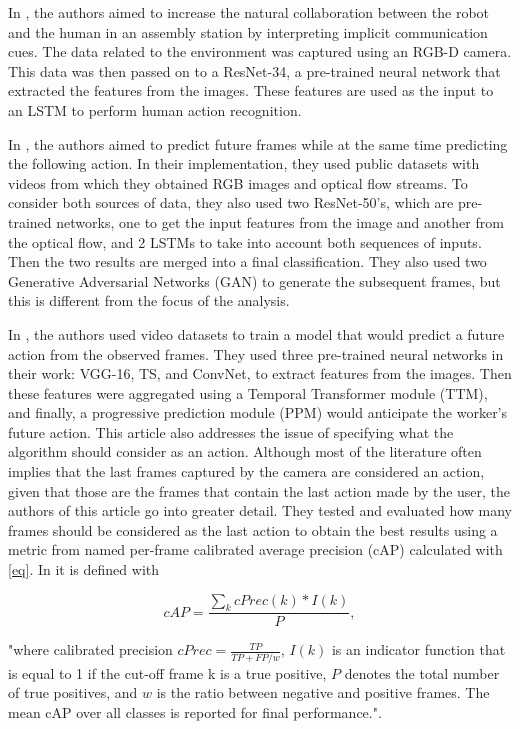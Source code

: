 In \cite{Moutinho2023}, the authors aimed to increase the natural collaboration between the robot and the human in an assembly station by interpreting implicit communication cues. The data related to the environment was captured using an RGB-D camera. This data was then passed on to a ResNet-34, a pre-trained neural network that extracted the features from the images. These features are used as the input to an LSTM to perform human action recognition.

In \cite{Gammulle2019}, the authors aimed to predict future frames while at the same time predicting the following action. In their implementation, they used public datasets with videos from which they obtained RGB images and optical flow streams. To consider both sources of data, they also used two ResNet-50's, which are pre-trained networks, one to get the input features from the image and another from the optical flow, and 2 LSTMs to take into account both sequences of inputs. Then the two results are merged into a final classification. They also used two Generative Adversarial Networks (GAN) to generate the subsequent frames, but this is different from the focus of the analysis.

In \cite{Wang2021}, the authors used video datasets to train a model that would predict a future action from the observed frames. They used three pre-trained neural networks in their work: VGG-16, TS, and ConvNet, to extract features from the images. Then these features were aggregated using a Temporal Transformer module (TTM), and finally, a progressive prediction module (PPM) would anticipate the worker's future action. This article also addresses the issue of specifying what the algorithm should consider as an action. Although most of the literature often implies that the last frames captured by the camera are considered an action, given that those are the frames that contain the last action made by the user, the authors of this article go into greater detail. They tested and evaluated how many frames should be considered as the last action to obtain the best results using a metric from \cite{Geest2016} named per-frame calibrated average precision (cAP) calculated with \eqref{eq}. In \cite{Wang2021} it is defined with

\begin{equation}
cAP=\frac{\sum_k cPrec(k) * I(k)}{P},
\label{eq}
\end{equation}

"where  calibrated  precision $cPrec=\frac{TP}{TP+FP/w}$, $I(k)$ is an indicator function that is equal to 1 if the cut-off frame k is a true positive, $P$ denotes the total number of true positives, and $w$ is the ratio between negative and positive frames. The mean cAP over all classes is reported for final performance.".

